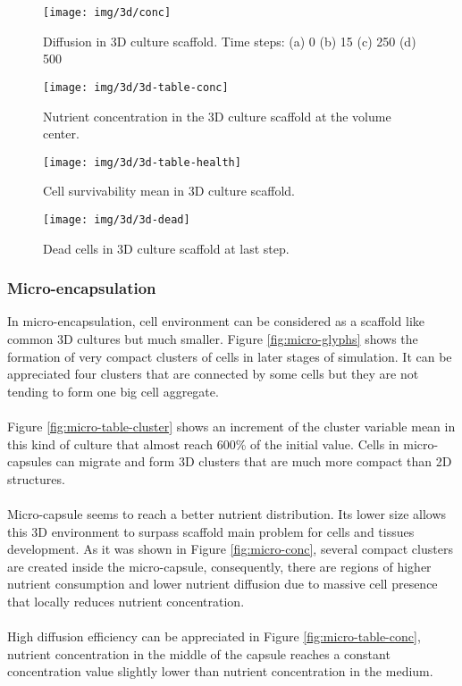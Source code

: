\begin{figure}[H]
\centering
\setlength\fboxsep{0pt}
\setlength\fboxrule{0.5pt}
\texttt{[image: img/3d/conc]}
\caption{Diffusion in 3D culture scaffold. Time steps: (a) 0 (b) 15 (c) 250 (d) 500}
\label{fig:3d-conc}
\end{figure}

\begin{figure}[H]
\centering
\setlength\fboxsep{0pt}
\setlength\fboxrule{0.5pt}
\texttt{[image: img/3d/3d-table-conc]}
\caption{Nutrient concentration in the 3D culture scaffold at the volume center.}
\label{fig:3d-table-conc}
\end{figure}

\vspace{15mm}

\begin{figure}[H]
\centering
\setlength\fboxsep{0pt}
\setlength\fboxrule{0.5pt}
\texttt{[image: img/3d/3d-table-health]}
\caption{Cell survivability mean in 3D culture scaffold.}
\label{fig:3d-table-health}
\end{figure}

\begin{figure}[H]
\centering
\setlength\fboxsep{0pt}
\setlength\fboxrule{0.5pt}
\texttt{[image: img/3d/3d-dead]}
\caption{Dead cells in 3D culture scaffold at last step.}
\label{fig:3d-dead}
\end{figure}

\newpage
\subsubsection{Micro-encapsulation}
In micro-encapsulation, cell environment can be considered as a scaffold like common 3D cultures but much smaller. Figure \ref{fig:micro-glyphs} shows the formation of very compact clusters of cells in later stages of simulation. It can be appreciated four clusters that are connected by some cells but they are not tending to form one big cell aggregate.\\
\\
Figure \ref{fig:micro-table-cluster} shows an increment of the cluster variable mean in this kind of culture that almost reach 600\% of the initial value. Cells in micro-capsules can migrate and form 3D clusters that are much more compact than 2D structures.\\
\\
Micro-capsule seems to reach a better nutrient distribution. Its lower size allows this 3D environment to surpass scaffold main problem for cells and tissues development. As it was shown in Figure \ref{fig:micro-conc}, several compact clusters are created inside the micro-capsule, consequently, there are regions of higher nutrient consumption and lower nutrient diffusion due to massive cell presence that locally reduces nutrient concentration.\\ 
\\
High diffusion efficiency can be appreciated in Figure \ref{fig:micro-table-conc}, nutrient concentration in the middle of the capsule reaches a constant concentration value slightly lower than nutrient concentration in the medium. 

